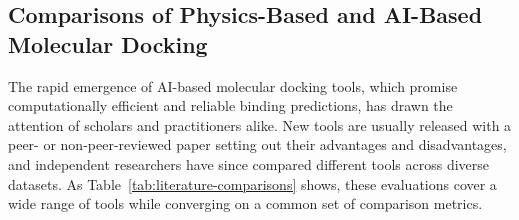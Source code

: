 \hypertarget{comparisons-of-physics-based-and-ai-based-molecular-docking}{%
\subsection{Comparisons of Physics-Based and AI-Based Molecular Docking}\label{comparisons-of-physics-based-and-ai-based-molecular-docking}}

The rapid emergence of AI-based molecular docking tools, which promise computationally efficient and reliable binding predictions, has drawn the attention of scholars and practitioners alike. New tools are usually released with a peer- or non-peer-reviewed paper setting out their advantages and disadvantages, and independent researchers have since compared different tools across diverse datasets. As Table~\ref{tab:literature-comparisons} shows, these evaluations cover a wide range of tools while converging on a common set of comparison metrics.


